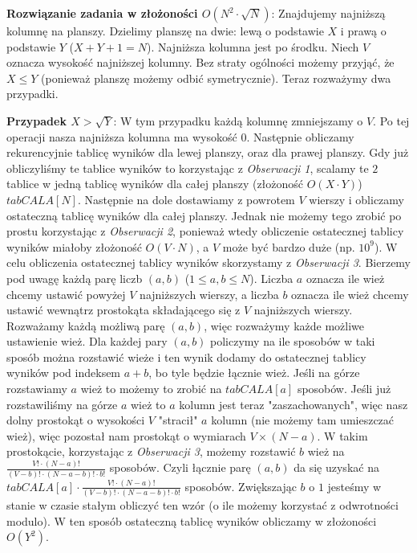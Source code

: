 \documentclass[opr,utf8]{sinol}
\newcounter{wn}
\begin{document}
\begin{tasktext}
\textbf{Rozwiązanie zadania w złożoności $O(N^2 \cdot \sqrt{N})$}: Znajdujemy najniższą kolumnę na planszy. Dzielimy planszę na dwie: lewą o podstawie $X$ i prawą o podstawie $Y$ ($X+Y+1 = N$). Najniższa kolumna jest po środku. Niech $V$ oznacza wysokość najniższej kolumny. Bez straty ogólności możemy przyjąć, że $X \leq Y$ (ponieważ planszę możemy odbić symetrycznie). Teraz rozważymy dwa przypadki.

\textbf{Przypadek $X > \sqrt{Y}$}: W tym przypadku każdą kolumnę zmniejszamy o $V$. Po tej operacji nasza najniższa kolumna ma wysokość $0$. Następnie obliczamy rekurencyjnie tablicę wyników dla lewej planszy, oraz dla prawej planszy. Gdy już obliczyliśmy te tablice wyników to korzystając z \textit{Obserwacji 1}, scalamy te $2$ tablice w jedną tablicę wyników dla całej planszy (złożoność $O(X \cdot Y)$) $tabCALA[N]$. Następnie na dole dostawiamy z powrotem $V$ wierszy i obliczamy ostateczną tablicę wyników dla całej planszy. Jednak nie możemy tego zrobić po prostu korzystając z \textit{Obserwacji 2}, ponieważ wtedy obliczenie ostatecznej tablicy wyników miałoby złożoność $O(V \cdot N)$, a $V$ może być bardzo duże (np. $10^9$). W celu obliczenia ostatecznej tablicy wyników skorzystamy z \textit{Obserwacji 3}. Bierzemy pod uwagę każdą parę liczb $(a,b)$ ($1 \leq a,b \leq N$). Liczba $a$ oznacza ile wież chcemy ustawić powyżej $V$ najniższych wierszy, a liczba $b$ oznacza ile wież chcemy ustawić wewnątrz prostokąta składającego się z $V$ najniższych wierszy. Rozważamy każdą możliwą parę $(a,b)$, więc rozważymy każde możliwe ustawienie wież. Dla każdej pary $(a,b)$ policzymy na ile sposobów w taki sposób można rozstawić wieże i ten wynik dodamy do ostatecznej tablicy wyników pod indeksem $a+b$, bo tyle będzie łącznie wież. Jeśli na górze rozstawiamy $a$ wież to możemy to zrobić na $tabCALA[a]$ sposobów. Jeśli już rozstawiliśmy na górze $a$ wież to $a$ kolumn jest teraz "zaszachowanych", więc nasz dolny prostokąt o wysokości $V$ "stracił" $a$ kolumn (nie możemy tam umieszczać wież), więc pozostał nam prostokąt o wymiarach $V \times (N-a)$. W takim prostokącie, korzystając z \textit{Obserwacji 3}, możemy rozstawić $b$ wież na $\frac{V! \cdot (N-a)!}{(V-b)! \cdot (N-a-b)! \cdot b!}$ sposobów. Czyli łącznie parę $(a,b)$ da się uzyskać na $tabCALA[a] \cdot \frac{V! \cdot (N-a)!}{(V-b)! \cdot (N-a-b)! \cdot b!}$ sposobów. Zwiększając $b$ o $1$ jesteśmy w stanie w czasie stałym obliczyć ten wzór (o ile możemy korzystać z odwrotności modulo). W ten sposób ostateczną tablicę wyników obliczamy w złożoności $O(Y^2)$.


\end{tasktext}
\end{document}
